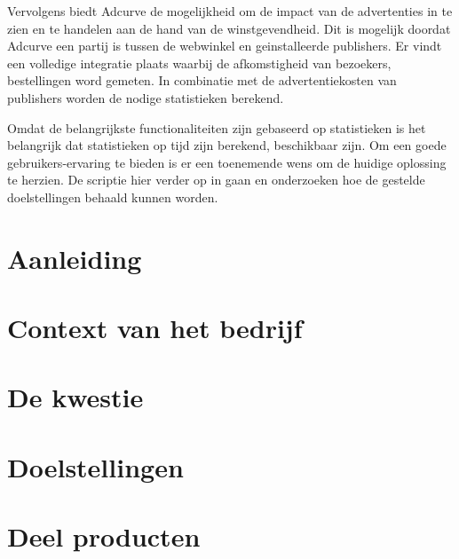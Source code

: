 Vervolgens biedt Adcurve de mogelijkheid om de impact van de advertenties in te zien en te handelen aan de hand van de winstgevendheid. Dit is mogelijk doordat Adcurve een partij is tussen de webwinkel en geinstalleerde publishers. Er vindt een volledige integratie plaats waarbij de afkomstigheid van bezoekers, bestellingen word gemeten. In combinatie met de advertentiekosten van publishers worden de nodige statistieken berekend.

Omdat de belangrijkste functionaliteiten zijn gebaseerd op statistieken is het belangrijk dat statistieken op tijd zijn berekend, beschikbaar zijn.
Om een goede gebruikers-ervaring te bieden is er een toenemende wens om de huidige oplossing te herzien. De scriptie hier verder op in gaan en onderzoeken hoe de gestelde doelstellingen behaald kunnen worden.


\section{Aanleiding} %

\section{Context van het bedrijf} %


\section{De kwestie} %

\section{Doelstellingen} %

\section{Deel producten}




